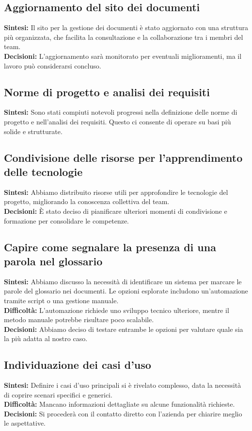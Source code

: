 \documentclass{article}
\begin{document}
    \subsection{Aggiornamento del sito dei documenti}
    \textbf{Sintesi:} Il sito per la gestione dei documenti è stato aggiornato con una struttura più organizzata, che facilita la consultazione e la collaborazione tra i membri del team. \\
    \textbf{Decisioni:} L'aggiornamento sarà monitorato per eventuali miglioramenti, ma il lavoro può considerarsi concluso. 

    \subsection{Norme di progetto e analisi dei requisiti}
    \textbf{Sintesi:} Sono stati compiuti notevoli progressi nella definizione delle norme di progetto e nell’analisi dei requisiti. Questo ci consente di operare su basi più solide e strutturate. \\

    \subsection{Condivisione delle risorse per l'apprendimento delle tecnologie}
    \textbf{Sintesi:} Abbiamo distribuito risorse utili per approfondire le tecnologie del progetto, migliorando la conoscenza collettiva del team. \\
    \textbf{Decisioni:} È stato deciso di pianificare ulteriori momenti di condivisione e formazione per consolidare le competenze.

    \subsection{Capire come segnalare la presenza di una parola nel glossario}
    \textbf{Sintesi:} Abbiamo discusso la necessità di identificare un sistema per marcare le parole del glossario nei documenti. Le opzioni esplorate includono un'automazione tramite script o una gestione manuale. \\
    \textbf{Difficoltà:} L'automazione richiede uno sviluppo tecnico ulteriore, mentre il metodo manuale potrebbe risultare poco scalabile. \\
    \textbf{Decisioni:} Abbiamo deciso di testare entrambe le opzioni per valutare quale sia la più adatta al nostro caso.

    \subsection{Individuazione dei casi d'uso}
    \textbf{Sintesi:} Definire i casi d’uso principali si è rivelato complesso, data la necessità di coprire scenari specifici e generici. \\
    \textbf{Difficoltà:} Mancano informazioni dettagliate su alcune funzionalità richieste. \\
    \textbf{Decisioni:} Si procederà con il contatto diretto con l'azienda per chiarire meglio le aspettative.
    
\end{document}
